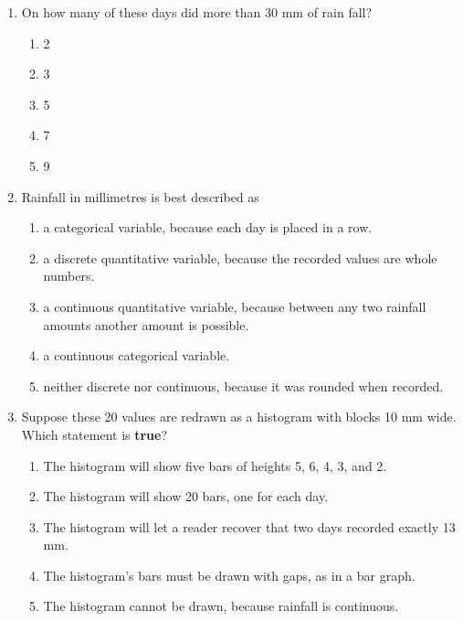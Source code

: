 \documentclass[12pt]{article}
\begin{document}
\vspace{0.10in}

\begin{enumerate}[leftmargin=1.9em, itemsep=0.13in]

  \item On how many of these days did more than 30 mm of rain fall?
        \begin{enumerate}[label=\textbf{(\Alph*)}, leftmargin=2.2em, itemsep=2pt]
          \item 2
          \item 3
          \item 5
          \item 7
          \item 9
                \hfill{}
        \end{enumerate}

  \item Rainfall in millimetres is best described as
        \begin{enumerate}[label=\textbf{(\Alph*)}, leftmargin=2.2em, itemsep=2pt]
          \item a categorical variable, because each day is placed in a row.
          \item a discrete quantitative variable, because the recorded values are whole numbers.
          \item a continuous quantitative variable, because between any two rainfall amounts
                another amount is possible.
          \item a continuous categorical variable.
          \item neither discrete nor continuous, because it was rounded when recorded.
                \hfill{}
        \end{enumerate}

  \item Suppose these 20 values are redrawn as a histogram with blocks 10 mm wide. Which
        statement is \textbf{true}?
        \begin{enumerate}[label=\textbf{(\Alph*)}, leftmargin=2.2em, itemsep=2pt]
          \item The histogram will show five bars of heights 5, 6, 4, 3, and 2.
          \item The histogram will show 20 bars, one for each day.
          \item The histogram will let a reader recover that two days recorded exactly 13 mm.
          \item The histogram's bars must be drawn with gaps, as in a bar graph.
          \item The histogram cannot be drawn, because rainfall is continuous.
                \hfill{}
        \end{enumerate}


\end{enumerate}
\end{document}
